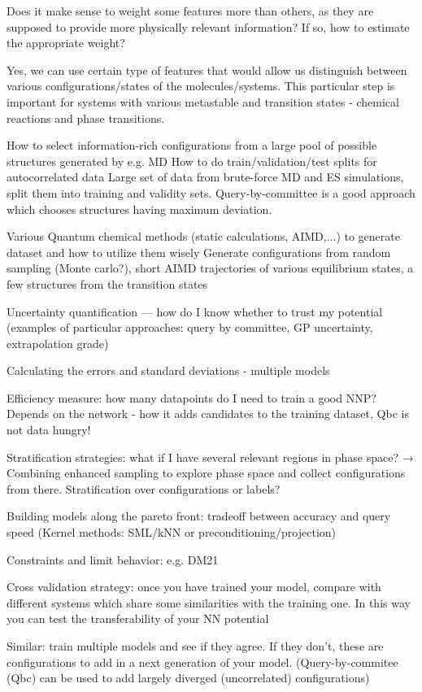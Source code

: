 \documentclass[9pt,bestpractices]{livecoms}
\begin{document}
Does it make sense to weight some features more than others, as they are supposed to provide more physically relevant information? If so, how to estimate the appropriate weight? 

Yes, we can use certain type of features that would allow us distinguish between various configurations/states of the molecules/systems. This particular step is important for systems with various metastable and transition states - chemical reactions and phase transitions. 

How to select information-rich configurations from a large pool of possible structures generated by e.g. MD
How to do train/validation/test splits for autocorrelated data
Large set of data from brute-force MD and ES simulations, split them into training and validity sets. Query-by-committee is a good approach which chooses structures having maximum deviation. 

Various Quantum chemical methods (static calculations, AIMD,...) to generate dataset and how to utilize them wisely
Generate configurations from random sampling (Monte carlo?), short AIMD trajectories of various equilibrium states, a few structures from the transition states

Uncertainty quantification — how do I know whether to trust my potential (examples of particular approaches: query by committee, GP uncertainty, extrapolation grade)

Calculating the errors and standard deviations - multiple models

Efficiency measure: how many datapoints do I need to train a good NNP?
Depends on the network - how it adds candidates to the training dataset, Qbc is not data hungry!

Stratification strategies: what if I have several relevant regions in phase space?
→ Combining enhanced sampling to explore phase space and collect configurations from there.
Stratification over configurations or labels?

Building models along the pareto front: tradeoff between accuracy and query speed (Kernel methods: SML/kNN or preconditioning/projection)

Constraints and limit behavior: e.g. DM21

Cross validation strategy: once you have trained your model, compare with different systems which share some similarities with the training one. In this way you can test the transferability of your NN potential

Similar: train multiple models and see if they agree. If they don’t, these are configurations to add in a next generation of your model. (Query-by-commitee (Qbc) can be used to add largely diverged (uncorrelated) configurations)
\end{document}
